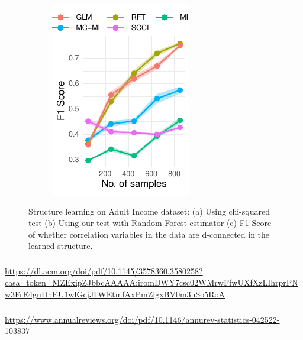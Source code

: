 \documentclass{beamer}
\begin{document}
\begin{frame}
\begin{figure}
\begin{subfigure}{.33 \textwidth}
			\caption{}
		\end{subfigure}%
		\begin{subfigure}{0.33\textwidth}
			\includegraphics[scale=0.7]{imgs/adult_F1.pdf}
			\caption{}
		\end{subfigure}
			\caption{Structure learning on Adult Income dataset:
			(a) Using chi-squared test (b) Using our test with
			Random Forest estimator (c) F1 Score of whether
			correlation variables in the data are d-connected in
			the learned structure.}
		\end{figure}
\end{frame}

\begin{frame}
	\frametitle{}
	\url{https://dl.acm.org/doi/pdf/10.1145/3578360.3580258?casa_token=MZExipZJbbcAAAAA:iromDWY7csc02WMrwFfwUXfXzLIhrprPNw3FrE4guDhEU1wlGcjJLWEtmfAxPmZlgxBV0m3uSo5RoA}	
\end{frame}

\begin{frame}
	\frametitle{}
\end{frame}

\begin{frame}
	\frametitle{}
\end{frame}

\begin{frame}
	\frametitle{}
	\url{https://www.annualreviews.org/doi/pdf/10.1146/annurev-statistics-042522-103837}
\end{frame}
\end{document}
